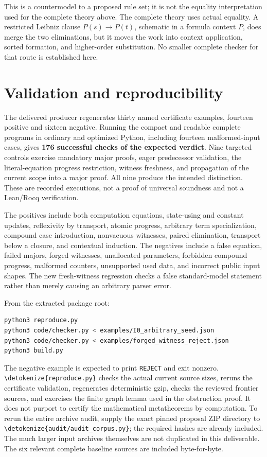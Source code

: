 \documentclass[11pt,letterpaper]{article}
\theoremstyle{definition}\newtheorem{definition}[theorem]{Definition}
\theoremstyle{remark}\newtheorem{remark}[theorem]{Remark}
\newcommand{\file}[1]{\expandafter\nolinkurl\expandafter{\detokenize{#1}}}
\begin{document}
This is a countermodel to a proposed rule set; it is not the equality
interpretation used for the complete theory above. The complete
theory uses actual equality. A restricted Leibniz clause
$P(s)\to P(t)$, schematic in a formula context $P$, does merge
the two eliminations, but it moves the work into context application,
sorted formation, and higher-order substitution. No smaller complete
checker for that route is established here.



\section{Validation and reproducibility}
\label{sec:validation}

The delivered producer regenerates thirty named certificate examples,
fourteen positive and sixteen negative. Running the compact and
readable complete programs in ordinary and optimized Python, including
fourteen malformed-input cases, gives \textbf{176 successful checks
of the expected verdict}. Nine targeted controls exercise mandatory
major proofs, eager predecessor validation, the literal-equation
progress restriction, witness freshness, and propagation of the
current scope into a major proof. All nine produce the intended
distinction. These are recorded executions, not a proof of universal
soundness and not a Lean/Rocq verification.

The positives include both computation equations, state-using and
constant updates, reflexivity by transport, atomic progress, arbitrary
term specialization, compound case introduction, nonvacuous witnesses,
paired elimination, transport below a closure, and contextual induction.
The negatives include a false equation, failed majors, forged witnesses,
unallocated parameters, forbidden compound progress, malformed counters,
unsupported used data, and incorrect public input shapes. The new
fresh-witness regression checks a false standard-model statement rather
than merely causing an arbitrary parser error.

From the extracted package root:
\begin{lstlisting}[language=bash]
python3 reproduce.py
python3 code/checker.py < examples/I0_arbitrary_seed.json
python3 code/checker.py < examples/forged_witness_reject.json
python3 build.py
\end{lstlisting}
The negative example is expected to print \texttt{REJECT} and exit
nonzero. \file{reproduce.py} checks the actual current source sizes,
reruns the certificate validation, regenerates deterministic gzip,
checks the reviewed frontier sources, and exercises the finite graph
lemma used in the obstruction proof. It does not purport to certify
the mathematical metatheorems by computation. To rerun the entire
archive audit, supply the exact pinned proposal ZIP directory to
\file{audit/audit_corpus.py}; the required hashes are already included.
The much larger input archives themselves are not duplicated in this
deliverable. The six relevant complete baseline sources are included
byte-for-byte.
\end{document}

